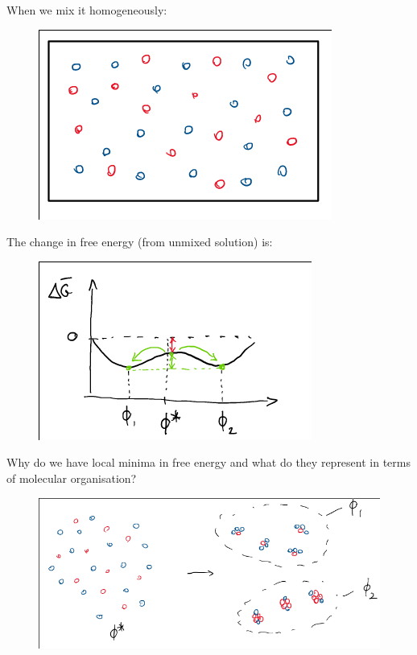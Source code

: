 \documentclass[a4paper, 11pt, normalem]{report}
\begin{document}
\begin{multicols}{2}
    When we mix it homogeneously:
    \begin{figure}[H]
        \centering
        \includegraphics[scale=0.5]{homo.png}
    \end{figure}
    \columnbreak
    The change in free energy (from unmixed solution) is:
    \begin{figure}[H]
        \centering
        \includegraphics[scale=0.5]{homofree.png}
    \end{figure}
\end{multicols}
Why do we have local minima in free energy and what do they represent in terms of molecular organisation?
\begin{figure}[H]
    \centering
    \includegraphics[scale=0.5]{locals.png}
\end{figure}
\end{document}
